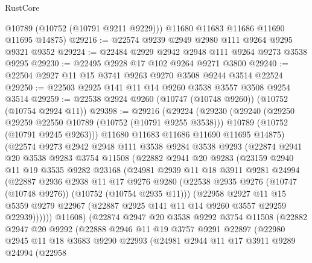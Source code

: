 \begin{lexlean}{RustCore}
\begin{coremodule}
        @10789
        (@10752 (@10791 @9211 @9229)))
      @11680
      @11683
      @11686
      @11690
      @11695
      @14875)
@29216 := @22574 @9239 @2949 @2980 @111 @9264 @9295 @9321 @9352
@29224 := @22484 @2929 @2942 @2948 @111 @9264 @9273 @3538 @9295
@29230 := @22495 @2928 @17 @102 @9264 @9271 @3800
@29240 := @22504 @2927 @11 @15 @3741 @9263 @9270 @3508 @9244 @3514 @22524
@29250 := @22503 @2925 @141 @11 @14 @9260 @3538 @3557 @3508 @9254 @3514
@29259 := @22538 @2924 @9260 (@10747 (@10748 @9260)) (@10752 (@10754 @2924 @11))
@29398 := @29216
    (@29224
      (@29230
        (@29240
          (@29250 @29259 @22550 @10789 (@10752 (@10791 @9255 @3538)))
          @10789
          (@10752 (@10791 @9245 @9263)))
        @11680
        @11683
        @11686
        @11690
        @11695
        @14875)
      (@22574
        @9273
        @2942
        @2948
        @111
        @3538
        @9284
        @3538
        @9293
        (@22874
          @2941
          @20
          @3538
          @9283
          @3754
          @11508
          (@22882
            @2941
            @20
            @9283
            (@23159
              @2940
              @11
              @19
              @3535
              @9282
              @23168
              (@24981
                @2939
                @11
                @18
                @3911
                @9281
                @24994
                (@22887
                  @2936
                  @2938
                  @11
                  @17
                  @9276
                  @9280
                  (@22538 @2935 @9276 (@10747 (@10748 @9276)) (@10752 (@10754 @2935 @11)))
                  (@22958
                    @2927
                    @11
                    @15
                    @5359
                    @9279
                    @22967
                    (@22887 @2925 @141 @11 @14 @9260 @3557 @29259 @22939))))))
          @11608)
        (@22874
          @2947
          @20
          @3538
          @9292
          @3754
          @11508
          (@22882
            @2947
            @20
            @9292
            (@22888
              @2946
              @11
              @19
              @3757
              @9291
              @22897
              (@22980
                @2945
                @11
                @18
                @3683
                @9290
                @22993
                (@24981
                  @2944
                  @11
                  @17
                  @3911
                  @9289
                  @24994
                  (@22958

\end{coremodule}
\end{lexlean}
